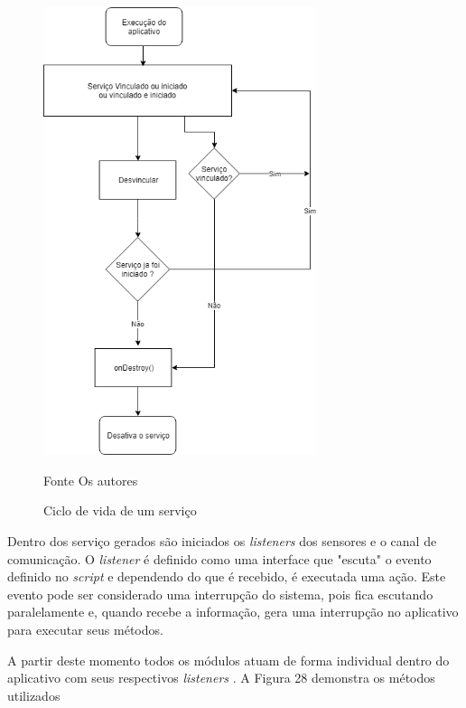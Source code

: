  \begin{figure}[H]

\begin{center}
     \caption{Ciclo de vida de um serviço }
  \includegraphics[width=80mm]{images/Cap4/Servicos_android.png}
\end{center}
 \scriptsize Fonte Os autores
  
\end{figure}



Dentro dos serviço gerados  são iniciados os \textit{listeners} dos sensores e o canal de comunicação.
O \textit{listener}  é definido como uma interface  que  "escuta"  o evento definido no \textit{script} e dependendo do que é recebido, é executada uma ação. Este evento pode ser considerado uma interrupção do sistema, pois fica escutando paralelamente e, quando recebe a informação, gera uma interrupção no aplicativo para executar seus métodos.

A partir deste momento todos os módulos atuam de forma individual dentro do aplicativo com seus respectivos \textit{listeners} . A Figura 28 demonstra os métodos utilizados

